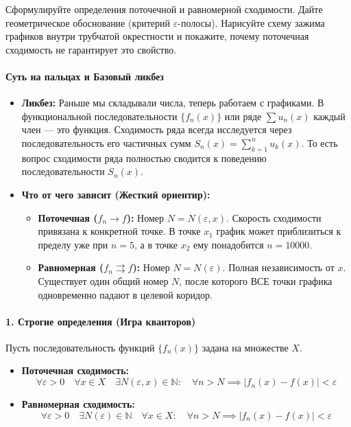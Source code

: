 
{Сформулируйте определения поточечной и равномерной сходимости. Дайте геометрическое обоснование (критерий $\varepsilon$-полосы). Нарисуйте схему зажима графиков внутри трубчатой окрестности и покажите, почему поточечная сходимость не гарантирует это свойство.}

\paragraph{Суть на пальцах и Базовый ликбез}
\begin{itemize}
    \item \textbf{Ликбез:} Раньше мы складывали числа, теперь работаем с графиками. В функциональной последовательности $\{f_n(x)\}$ или ряде $\sum u_n(x)$ каждый член — это функция. Сходимость ряда всегда исследуется через последовательность его частичных сумм $S_n(x) = \sum_{k=1}^n u_k(x)$. То есть вопрос сходимости ряда полностью сводится к поведению последовательности $S_n(x)$.
    \item \textbf{Что от чего зависит (Жесткий ориентир):}
    \begin{itemize}
        \item \textbf{Поточечная ($f_n \to f$):} Номер $N = N(\varepsilon, x)$. Скорость сходимости привязана к конкретной точке. В точке $x_1$ график может приблизиться к пределу уже при $n=5$, а в точке $x_2$ ему понадобится $n=10000$.
        \item \textbf{Равномерная ($f_n \rightrightarrows f$):} Номер $N = N(\varepsilon)$. Полная независимость от $x$. Существует один общий номер $N$, после которого ВСЕ точки графика одновременно падают в целевой коридор.
    \end{itemize}
\end{itemize}

\paragraph{1. Строгие определения (Игра кванторов)}
Пусть последовательность функций $\{f_n(x)\}$ задана на множестве $X$.
\begin{itemize}
    \item \textbf{Поточечная сходимость:}
    $$ \forall \varepsilon > 0 \quad \forall x \in X \quad \exists N(\varepsilon, x) \in \mathbb{N} : \quad \forall n > N \implies |f_n(x) - f(x)| < \varepsilon $$
    
    \item \textbf{Равномерная сходимость:}
    $$ \forall \varepsilon > 0 \quad \exists N(\varepsilon) \in \mathbb{N} \quad \forall x \in X : \quad \forall n > N \implies |f_n(x) - f(x)| < \varepsilon $$
\end{itemize}

